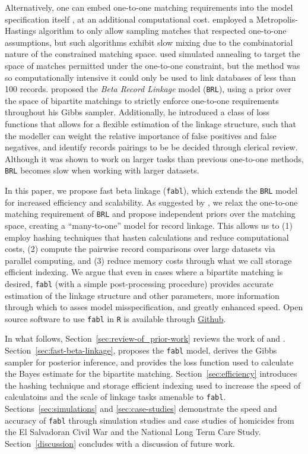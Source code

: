 \documentclass[ba]{imsart}
\begin{document}
	Alternatively, one can embed one-to-one matching requirements into the model specification itself \citep{gutman2013bayesian, liseo_2011}, at an additional computational cost. \cite{larsen2005} employed a Metropolis-Hastings algorithm to only allow sampling matches that respected one-to-one assumptions, but such algorithms exhibit slow mixing due to the combinatorial nature of the constrained matching space. \cite{fortunato_2010} used simulated annealing to target the space of matches permitted under the one-to-one constraint, but the method was so computationally intensive it could only be used to link databases of less than 100 records. \cite{sadinle_bayesian_2017} proposed the \emph{Beta Record Linkage} model (\texttt{BRL}), using a prior over the space of bipartite matchings to strictly enforce one-to-one requirements throughout his Gibbs sampler. Additionally, he introduced a class of loss functions that allows for a flexible estimation of the linkage structure, such that the modeller can weight the relative importance of false positives and false negatives, and identify records pairings to be be decided through clerical review. Although it was shown to work on larger tasks than previous one-to-one methods, \texttt{BRL} becomes slow when working with larger datasets. 
	
	In this paper, we propose fast beta linkage (\texttt{fabl}), which extends the \texttt{BRL} model for increased efficiency and scalability. As suggested by \cite{heck2019}, we relax the one-to-one matching requirement of \texttt{BRL} and propose independent priors over the matching space, creating a ``many-to-one'' model for record linkage. This allows us to (1) employ hashing techniques that hasten calculations and reduce computational costs, (2) compute the pairwise record comparisons over large datasets via parallel computing, and (3) reduce memory costs through what we call storage efficient indexing. We argue that even in cases where a bipartite matching is desired, \texttt{fabl} (with a simple post-processing procedure) provides accurate estimation of the linkage structure and other parameters, more information through which to asses model misspecification, and greatly enhanced speed. Open source software to use \texttt{fabl} in \texttt{R} is available through \href{https://github.com/briankundinger/parlrdev}{Github}.
	
	In what follows, Section~\ref{sec:review-of_prior-work} reviews the work of \cite{fellegi_theory_1969} and \cite{sadinle_bayesian_2017}. Section~\ref{sec:fast-beta-linkage}, proposes the \texttt{fabl} model, derives the Gibbs sampler for posterior inference, and provides the loss function used to calculate the Bayes estimate for the bipartite matching. Section~\ref{sec:efficiency} introduces the hashing technique and storage efficient indexing used to increase the speed of calculatoins and the scale of linkage tasks amenable to \texttt{fabl}. Sections~\ref{sec:simulations} and \ref{sec:case-studies} demonstrate the speed and accuracy of \texttt{fabl} through simulation studies and case studies of homicides from the El Salvadoran Civil War and the National Long Term Care Study. Section~\ref{discussion} concludes with a discussion of future work. 
	
\end{document}

